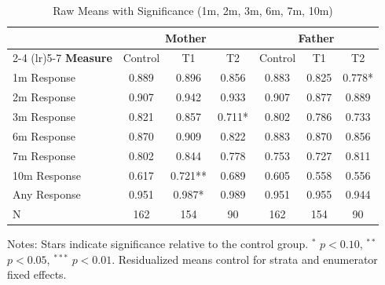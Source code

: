 \begin{table}[htbp]
\centering
\caption{Raw Means with Significance (1m, 2m, 3m, 6m, 7m, 10m)}
\begin{tabular}{lcccccc}
\toprule
& \multicolumn{3}{c}{\textbf{Mother}} & \multicolumn{3}{c}{\textbf{Father}} \\
\cmidrule(lr){2-4} \cmidrule(lr){5-7}
\textbf{Measure} & Control & T1 & T2 & Control & T1 & T2 \\
\midrule
1m Response &  0.889 &  0.896 &  0.856 &  0.883 &  0.825 &  0.778* \\
2m Response &  0.907 &  0.942 &  0.933 &  0.907 &  0.877 &  0.889 \\
3m Response &  0.821 &  0.857 &  0.711* &  0.802 &  0.786 &  0.733 \\
6m Response &  0.870 &  0.909 &  0.822 &  0.883 &  0.870 &  0.856 \\
7m Response &  0.802 &  0.844 &  0.778 &  0.753 &  0.727 &  0.811 \\
10m Response &  0.617 &  0.721** &  0.689 &  0.605 &  0.558 &  0.556 \\
Any Response &  0.951 &  0.987* &  0.989 &  0.951 &  0.955 &  0.944 \\
N & 162 & 154 & 90 & 162 & 154 & 90 \\
\bottomrule
\end{tabular}
\begin{tablenotes}
\small
Notes: Stars indicate significance relative to the control group. 
$^{*}$ $p<0.10$, $^{**}$ $p<0.05$, $^{***}$ $p<0.01$.
Residualized means control for strata and enumerator fixed effects.
\end{tablenotes}
\end{table}
